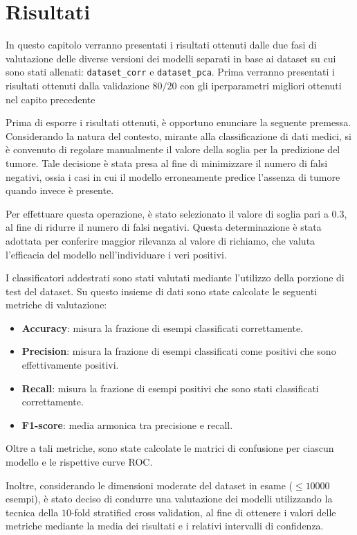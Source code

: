 \chapter{Risultati} \label{chp:risultati}
In questo capitolo verranno presentati i risultati ottenuti dalle due fasi di valutazione
delle diverse versioni dei modelli separati in base ai dataset su cui sono stati 
allenati: \texttt{dataset\_corr} e \texttt{dataset\_pca}. Prima verranno presentati
i risultati ottenuti dalla validazione $80/20$ con gli iperparametri migliori 
ottenuti nel capito precedente

Prima di esporre i risultati ottenuti, è opportuno enunciare la seguente premessa.
Considerando la natura del contesto, mirante alla classificazione di dati medici,
si è convenuto di regolare manualmente il valore della soglia per la predizione
del tumore. Tale decisione è stata presa al fine di minimizzare il numero di
falsi negativi, ossia i casi in cui il modello erroneamente predice l'assenza di
tumore quando invece è presente.

Per effettuare questa operazione, è stato selezionato il valore di soglia pari a
$0.3$, al fine di ridurre il numero di falsi negativi. Questa determinazione è
stata adottata per conferire maggior rilevanza al valore di richiamo, che valuta
l'efficacia del modello nell'individuare i veri positivi.

I classificatori addestrati sono stati valutati mediante l'utilizzo della
porzione di test del dataset. Su questo insieme di dati sono state calcolate le
seguenti metriche di valutazione:

\begin{itemize}
    \item \textbf{Accuracy}: misura la frazione di esempi classificati correttamente.
    \item \textbf{Precision}: misura la frazione di esempi classificati come
          positivi che sono effettivamente positivi.
    \item \textbf{Recall}: misura la frazione di esempi positivi che sono stati
          classificati correttamente.
    \item \textbf{F1-score}: media armonica tra precisione e recall.
\end{itemize}

Oltre a tali metriche, sono state calcolate le matrici di confusione per ciascun
modello e le rispettive curve ROC.

Inoltre, considerando le dimensioni moderate del dataset in esame ($\leq 10000$
esempi), è stato deciso di condurre una valutazione dei modelli utilizzando la
tecnica della $10$-fold stratified cross validation, al fine di ottenere i
valori delle metriche mediante la media dei risultati e i relativi intervalli di
confidenza.

